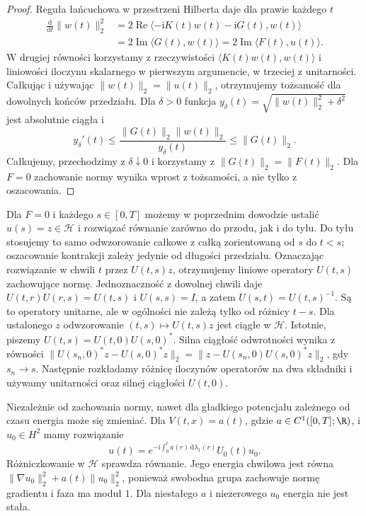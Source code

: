 \begin{proof}
Reguła łańcuchowa w przestrzeni Hilberta daje
dla prawie każdego $t$
\[
 \begin{split}
 \frac{\mathrm d}{\mathrm dt}\|w(t)\|_2^2
 &=2\operatorname{Re}\langle-\mathrm iK(t)w(t)
                              -\mathrm iG(t),w(t)\rangle\\
 &=2\operatorname{Im}\langle G(t),w(t)\rangle
 =2\operatorname{Im}\langle F(t),u(t)\rangle .
 \end{split}
\]
W drugiej równości korzystamy z rzeczywistości
$\langle K(t)w(t),w(t)\rangle$ i liniowości
iloczynu skalarnego w pierwszym argumencie,
w trzeciej z unitarności. Całkując i używając
$\|w(t)\|_2=\|u(t)\|_2$, otrzymujemy tożsamość
dla dowolnych końców przedziału.
Dla $\delta>0$ funkcja
$y_\delta(t)=\sqrt{\|w(t)\|_2^2+\delta^2}$
jest absolutnie ciągła i
\[
 y_\delta'(t)
 \le\frac{\|G(t)\|_2\|w(t)\|_2}{y_\delta(t)}
 \le\|G(t)\|_2 .
\]
Całkujemy, przechodzimy z $\delta\downarrow0$
i korzystamy z $\|G(t)\|_2=\|F(t)\|_2$.
Dla $F=0$ zachowanie normy wynika wprost
z tożsamości, a nie tylko z oszacowania.
\end{proof}

\begin{uwaga}
Dla $F=0$ i każdego $s\in[0,T]$ możemy w poprzednim
dowodzie ustalić $u(s)=z\in\mathcal H$ i rozwiązać
równanie zarówno do przodu, jak i do tyłu.
Do tyłu stosujemy to samo odwzorowanie całkowe
z całką zorientowaną od $s$ do $t<s$;
oszacowanie kontrakcji zależy jedynie od długości
przedziału. Oznaczając rozwiązanie w chwili $t$
przez $U(t,s)z$, otrzymujemy liniowe operatory
$U(t,s)$ zachowujące normę. Jednoznaczność z
dowolnej chwili daje
$U(t,r)U(r,s)=U(t,s)$ i $U(s,s)=I$, a zatem
$U(s,t)=U(t,s)^{-1}$. Są to operatory unitarne,
ale w ogólności nie zależą tylko od różnicy $t-s$.
Dla ustalonego $z$ odwzorowanie $(t,s)\mapsto U(t,s)z$
jest ciągłe w $\mathcal H$. Istotnie, piszemy
$U(t,s)=U(t,0)U(s,0)^*$.
Silna ciągłość odwrotności wynika z równości
$\|U(s_n,0)^*z-U(s,0)^*z\|_2
=\|z-U(s_n,0)U(s,0)^*z\|_2$,
gdy $s_n\to s$. Następnie rozkładamy różnicę
iloczynów operatorów na dwa składniki i używamy
unitarności oraz silnej ciągłości $U(t,0)$.

Niezależnie od zachowania normy, nawet dla gładkiego
potencjału zależnego od czasu energia może się
zmieniać. Dla $V(t,x)=a(t)$, gdzie $a\in C^1([0,T];\R)$,
i $u_0\in H^2$ mamy rozwiązanie
\[
 u(t)=e^{-\mathrm i\int_0^t a(r)\,\mathrm d\lambda_1(r)}
       U_0(t)u_0 .
\]
Różniczkowanie w $\mathcal H$ sprawdza równanie.
Jego energia chwilowa jest równa
$\|\nabla u_0\|_2^2+a(t)\|u_0\|_2^2$,
ponieważ swobodna grupa zachowuje normę gradientu
i faza ma moduł $1$. Dla niestałego $a$ i niezerowego
$u_0$ energia nie jest stała.
\end{uwaga}

